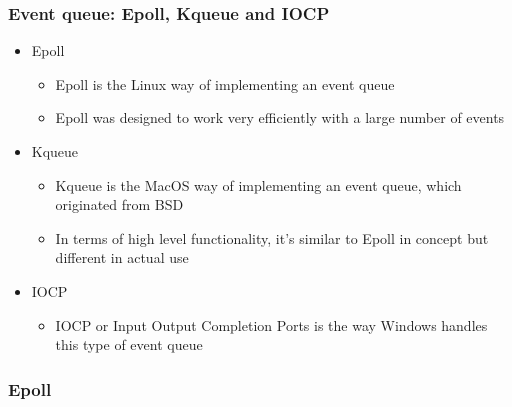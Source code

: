 \begin{frame}[fragile]
    \frametitle{Event queue: Epoll, Kqueue and IOCP}
% 
% 
% 
    \begin{itemize}
        \item Epoll
    	\begin{itemize}
    	    \item Epoll is the Linux way of implementing an event queue
    	    \item Epoll was designed to work very efficiently with a large number of events
    	\end{itemize}
        \item Kqueue
    	\begin{itemize}
    	    \item Kqueue is the MacOS way of implementing an event queue, which originated from BSD
    	    \item In terms of high level functionality, it's similar to Epoll in concept but different in actual use
    	\end{itemize}
        \item IOCP
    	\begin{itemize}
    	    \item IOCP or Input Output Completion Ports is the way Windows handles this type of event queue
    	\end{itemize}
    \end{itemize}

\end{frame}
\begin{frame}[fragile]
    \frametitle{Epoll}
% 
% 
% 
\end{frame}
